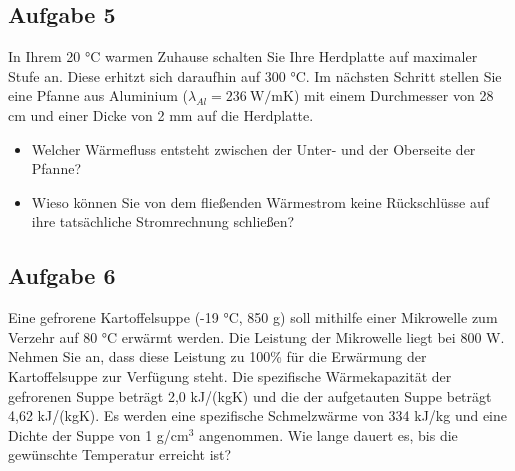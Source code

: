 \documentclass[a4paper,11pt]{article}
\newif\ifshowme
\begin{document}
\subsection*{Aufgabe 5}
In Ihrem 20 °C warmen Zuhause schalten Sie Ihre Herdplatte auf maximaler Stufe an. Diese erhitzt sich daraufhin auf 300 °C. Im nächsten Schritt stellen Sie eine Pfanne aus Aluminium ($\lambda_{Al} = 236~\text{W/mK}$) mit einem Durchmesser von 28 cm und einer Dicke von 2 mm auf die Herdplatte.
\begin{itemize}
\item Welcher Wärmefluss entsteht zwischen der Unter- und der Oberseite der Pfanne?
\ifshowme
\antwort{
\begin{align*}
\dot{Q} &= \lambda_{Al} \cdot \frac{A}{d} \cdot (\Delta T) \\
&= 236~\text{W/mK} \cdot \frac{\pi \cdot 0,14~\text{m}^2}{0,002~\text{m}} \cdot 280~\text{K}\\
&= 2.034.445~\text{J}\\
&= 2.034~\text{kJ}
\end{align*}
}
\else
\fi

\item Wieso können Sie von dem fließenden Wärmestrom keine Rückschlüsse auf ihre tatsächliche Stromrechnung schließen?
\ifshowme
\antwort{
Das Delta T wird mit der Zeit immer geringer. Die Herdplatte muss anfänglich eine viel größere Leistung aufbringen um die kalte Herdplatte (bzw auch die Pfanne) zu erhitzen. Ein typischer Herd hat eine Leistung von circa 10 kW. Für einen konstanten Wärmestrom aus unserer Aufgabe wären 2 Megawatt notwendig!
}
\pagebreak
\else
\fi

\end{itemize}



\subsection*{Aufgabe 6}
Eine gefrorene Kartoffelsuppe (-19 °C, 850 g) soll mithilfe einer Mikrowelle zum Verzehr auf
80 °C erwärmt werden. Die Leistung der Mikrowelle liegt bei 800 W. Nehmen Sie an, dass
diese Leistung zu 100\% für die Erwärmung der Kartoffelsuppe zur Verfügung steht.
Die spezifische Wärmekapazität der gefrorenen Suppe beträgt 2,0 kJ/(kgK) und die der
aufgetauten Suppe beträgt 4,62 kJ/(kgK). Es werden eine spezifische Schmelzwärme von 334
kJ/kg und eine Dichte der Suppe von 1 g/cm$^3$ angenommen. \pp
Wie lange dauert es, bis die gewünschte Temperatur erreicht ist?
\end{document}
